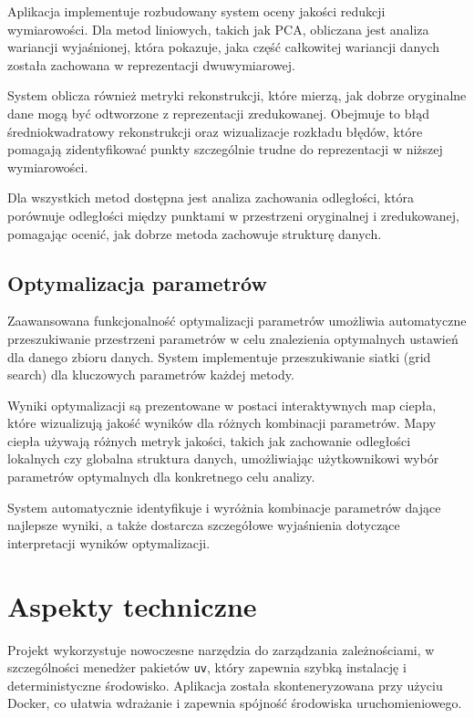 \documentclass[a4paper, 12pt]{article}
\begin{document}
Aplikacja implementuje rozbudowany system oceny jakości redukcji wymiarowości. Dla metod liniowych, takich jak PCA, obliczana jest analiza wariancji wyjaśnionej, która pokazuje, jaka część całkowitej wariancji danych została zachowana w reprezentacji dwuwymiarowej.

System oblicza również metryki rekonstrukcji, które mierzą, jak dobrze oryginalne dane mogą być odtworzone z reprezentacji zredukowanej. Obejmuje to błąd średniokwadratowy rekonstrukcji oraz wizualizacje rozkładu błędów, które pomagają zidentyfikować punkty szczególnie trudne do reprezentacji w niższej wymiarowości.

Dla wszystkich metod dostępna jest analiza zachowania odległości, która porównuje odległości między punktami w przestrzeni oryginalnej i zredukowanej, pomagając ocenić, jak dobrze metoda zachowuje strukturę danych.

\subsection{Optymalizacja parametrów}

Zaawansowana funkcjonalność optymalizacji parametrów umożliwia automatyczne przeszukiwanie przestrzeni parametrów w celu znalezienia optymalnych ustawień dla danego zbioru danych. System implementuje przeszukiwanie siatki (grid search) dla kluczowych parametrów każdej metody.

Wyniki optymalizacji są prezentowane w postaci interaktywnych map ciepła, które wizualizują jakość wyników dla różnych kombinacji parametrów. Mapy ciepła używają różnych metryk jakości, takich jak zachowanie odległości lokalnych czy globalna struktura danych, umożliwiając użytkownikowi wybór parametrów optymalnych dla konkretnego celu analizy.

System automatycznie identyfikuje i wyróżnia kombinacje parametrów dające najlepsze wyniki, a także dostarcza szczegółowe wyjaśnienia dotyczące interpretacji wyników optymalizacji.

\section{Aspekty techniczne}

Projekt wykorzystuje nowoczesne narzędzia do zarządzania zależnościami, w szczególności menedżer pakietów \texttt{uv}, który zapewnia szybką instalację i deterministyczne środowisko. Aplikacja została skonteneryzowana przy użyciu Docker, co ułatwia wdrażanie i zapewnia spójność środowiska uruchomieniowego.
\end{document}
